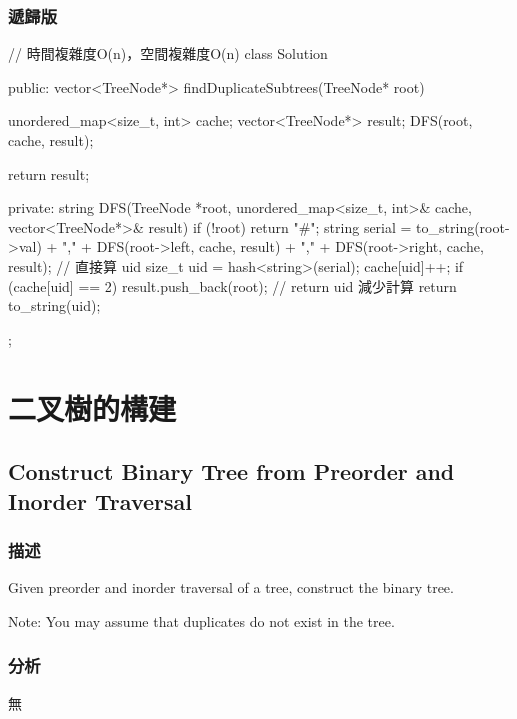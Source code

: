 \subsubsection{遞歸版}
\begin{Code}
// 時間複雜度O(n)，空間複雜度O(n)
class Solution {
public:
    vector<TreeNode*> findDuplicateSubtrees(TreeNode* root) {
        unordered_map<size_t, int> cache;
        vector<TreeNode*> result;
        DFS(root, cache, result);

        return result;
    }
private:
    string DFS(TreeNode *root, unordered_map<size_t, int>& cache, vector<TreeNode*>& result)
    {
        if (!root) return "#";
        string serial = to_string(root->val) + "," + DFS(root->left, cache, result)
            + "," + DFS(root->right, cache, result);
        // 直接算 uid
        size_t uid = hash<string>{}(serial);
        cache[uid]++;
        if (cache[uid] == 2)
            result.push_back(root);
        // return uid 減少計算
        return to_string(uid);
    }
};
\end{Code}



\section{二叉樹的構建} %


\subsection{Construct Binary Tree from Preorder and Inorder Traversal}
\label{sec:construct-binary-tree-from-preorder-and-inorder-traversal}


\subsubsection{描述}
Given preorder and inorder traversal of a tree, construct the binary tree.

Note:
You may assume that duplicates do not exist in the tree.


\subsubsection{分析}
無


